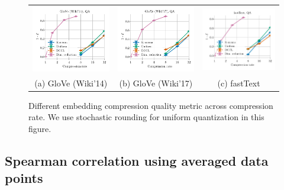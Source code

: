 \begin{figure}
\begin{tabular}{@{\hskip -0.0in}c@{\hskip -0.0in}c@{\hskip -0.0in}c@{\hskip -0.0in}}
		\includegraphics[width=.245\linewidth]{figures/glove400k_synthetics-large-dim_subspace-dist-normalized_vs_compression_linx_stoc.pdf} &
		\includegraphics[width=.245\linewidth]{figures/glove-wiki400k-am_synthetics-large-dim_subspace-dist-normalized_vs_compression_linx_stoc.pdf} &
		\includegraphics[width=.245\linewidth]{figures/fasttext1m_synthetics-large-dim_subspace-dist-normalized_vs_compression_linx_stoc.pdf}	\\
		(a) GloVe (Wiki'14) & \;\;\;\;(b) GloVe (Wiki'17)  & \;\;\;\;\;\;(c) fastText
	\end{tabular}
	\caption{Different embedding compression quality metric across compression rate. We use stochastic rounding for uniform quantization in this figure. }
	\label{fig:metric_vs_correlation_stoc}
\end{figure}


\subsection{Spearman correlation using averaged data points}
\label{label:ave_spearman}

